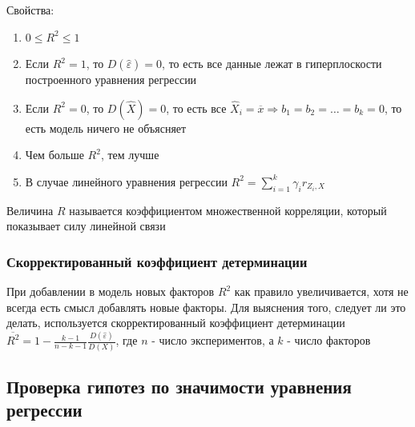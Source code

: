 \documentclass[12pt]{article}
\begin{document}
Свойства:

\begin{enumerate}
    \item $0 \leq R^2 \leq 1$
    \item Если $R^2 = 1$, то $D(\hat \varepsilon) = 0$, то есть все данные лежат в гиперплоскости построенного уравнения регрессии
    \item Если $R^2 = 0$, то $D(\hat X) = 0$, то есть все $\hat X_i = \overline{x} \Longrightarrow b_1 = b_2 = \dots = b_k = 0$, то есть модель ничего не объясняет
    \item Чем больше $R^2$, тем лучше
    \item В случае линейного уравнения регрессии $R^2 = \sum_{i = 1}^k \gamma_i r_{Z_i, X}$
\end{enumerate}

\Def Величина $R$ называется коэффициентом множественной корреляции, который показывает силу линейной связи

\subsubsection{Скорректированный коэффициент детерминации}

При добавлении в модель новых факторов $R^2$ как правило увеличивается, хотя не всегда есть смысл добавлять новые факторы. 
Для выяснения того, следует ли это делать, используется скорректированный коэффициент детерминации $\overline{R^2} = 1 - \frac{k - 1}{n - k - 1} \frac{D(\hat \varepsilon)}{D(X)}$, 
где $n$ - число экспериментов, а $k$ - число факторов

\subsection{Проверка гипотез по значимости уравнения регрессии}
\end{document}
